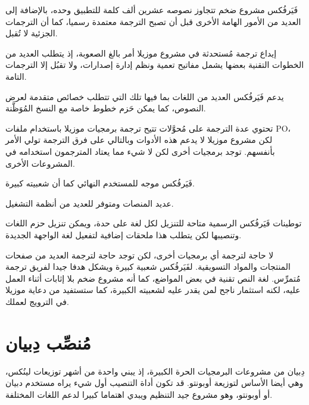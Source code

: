 \startitemize[1]
\item فَيَرفُكس مشروع ضخم تتجاوز نصوصه عشرين ألف كلمة للتطبيق وحده،
بالإضافة إلى العديد من الأمور الهامة الأخرى قبل أن تصبح الترجمة معتمدة
رسميا، كما أن الترجمات الجزئية لا تُقبل.
\item إيداع ترجمة مُستحدثة في مشروع موزيلا أمر بالغ الصعوبة، إذ يتطلب
العديد من الخطوات التقنية بعضها يشمل مفاتيح تعمية ونظم إدارة إصدارات،
ولا تقبُل إلا الترجمات التامة.
\item يدعم فَيَرفُكس العديد من اللغات بما فيها تلك التي تتطلب خصائص
متقدمة لعرض النصوص، كما يمكن حَزم خطوط خاصة مع النسخ المُوَظَّنة.
\item تحتوي عدة الترجمة على مُحوَّلات تتيح ترجمة برمجيات موزيلا باستخدام
ملفات PO، لكن مشروع موزيلا لا يدعم هذه الأدوات وبالتالي على فرق الترجمة
تولي الأمر بأنفسهم. توجد برمجيات أخرى لكن لا شيء مما يعتاد المترجمون
استخدامه في المشروعات الأخرى.
\item فَيَرفُكس موجه للمستخدم النهائي كما أن شعبيته كبيرة.
\item عديد المنصات ومتوفر للعديد من أنظمة التشغيل.
\item توطينات فَيَرفُكس الرسمية متاحة للتنزيل لكل لغة على حدة، ويمكن
تنزيل حزم اللغات وتنصيبها لكن يتطلب هذا ملحقات إضافية لتفعيل لغة
الواجهة الجديدة.
\item لا حاجة لترجمة أي برمجيات أخرى، لكن توجد حاجة لترجمة العديد من
صفحات المنتجات والمواد التسويقية.
\stopitemize
لفَيَرفُكس شعبية كبيرة ويشكل هدفا جيدا لفريق ترجمة مُتمرِّس. لغة النص
تقنية في بعض المواضع، كما أنه مشروع ضخم بلا إثابات أثناء العمل عليه،
لكنه استثمار ناجح لمن يقدر عليه لشعبيته الكبيرة، كما ستستفيد من دعاية
موزيلا في الترويج لعملك.

\section{مُنصِّب دِبيان}
دِبيان من مشروعات البرمجيات الحرة الكبيرة، إذ يبني واحدة من أشهر توزيعات
لينُكس، وهي أيضا الأساس لتوزيعة أوبونتو. قد تكون أداة التنصيب أول شيء
يراه مستخدم دبيان أو أوبونتو، وهو مشروع جيد التنظيم ويبدي اهتماما كبيرا
لدعم اللغات المختلفة.

